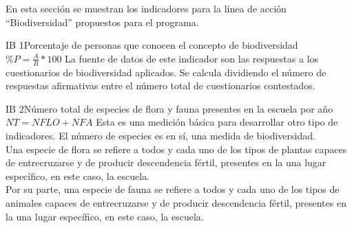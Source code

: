 En esta sección se muestran los indicadores para la línea de acción ``Biodiversidad'' propuestos para el programa.
\begin{indicador}{IB 1}{Porcentaje de personas que conocen el concepto de biodiversidad}
	{$\%P = \frac{A}{B} * 100$} 
	{
		La fuente de datos de este indicador son las respuestas a los cuestionarios de biodiversidad aplicados. Se calcula dividiendo el número de respuestas afirmativas entre el número total de cuestionarios contestados. 
	} 	
\end{indicador}
\begin{indicador}{IB 2}{Número total de especies de flora y fauna presentes en la escuela por año}
	{$NT = NFLO + NFA$}
	{
		Esta es una medición básica para desarrollar otro tipo de indicadores. El número de especies es en sí, una medida de biodiversidad.\\

		Una especie de flora se refiere a todos y cada uno de los tipos de plantas capaces de entrecruzarse y de producir descendencia fértil, presentes en la una lugar específico, en este caso, la escuela.\\

		Por su parte, una especie de fauna se refiere a todos y cada uno de los tipos de animales capaces de entrecruzarse y de producir descendencia fértil, presentes en la una lugar específico, en este caso, la escuela.
	} 	
\end{indicador}
